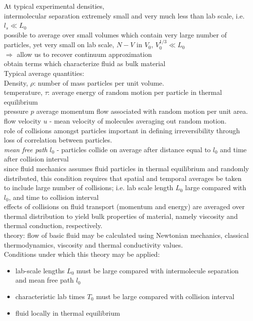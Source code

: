 At typical experimental densities, \\
intermolecular separation extremely small and very much less than lab scale, i.e. $l_s \ll L_0$ \\
possible to average over small volumes which contain very large number of particles, yet very small on lab scale, $N-V$ in $V_0$, $V_0^{1/3} \ll L_0$ \\
$\Longrightarrow$ allow us to recover continuum approximation \\
obtain terms which characterize fluid as bulk material \\

Typical average quantities: \\
Density, $\rho$: number of mass particles per unit volume. \\
temperature, $\tau$: average energy of random motion per particle in thermal equilibrium \\
pressure $p$ average momentum flow associated with random motion per unit area. \\
flow velocity $u$ - mean velocity of molecules averaging out random motion. \\

role of collisions amongst particles important in defining irreversibility through loss of correlation between particles. \\

\emph{mean free path} $l_0$ - particles collide on average after distance equal to $l_0$ and time after collision interval\\

since fluid mechanics assumes fluid particles in thermal equilibrium and randomly distributed, this condition requires that spatial and temporal averages be taken to include large number of collisions; i.e. lab scale length $L_0$ large compared with $l_0$, and time to collision interval \\

effects of collisions on fluid transport (momentum and energy) are averaged over thermal distribution to yield bulk properties of material, namely viscosity and thermal conduction, respectively. \\

theory: flow of basic fluid may be calculated using Newtonian mechanics, classical thermodynamics, viscosity and thermal conductivity values. \\
Conditions under which this theory may be applied: \\
\begin{itemize}
	\item lab-scale lengths $L_0$ must be large compared with intermolecule separation and mean free path $l_0$ 
	\item characteristic lab times $T_0$ must be large compared with collision interval
	\item fluid locally in thermal equilibrium
\end{itemize}

